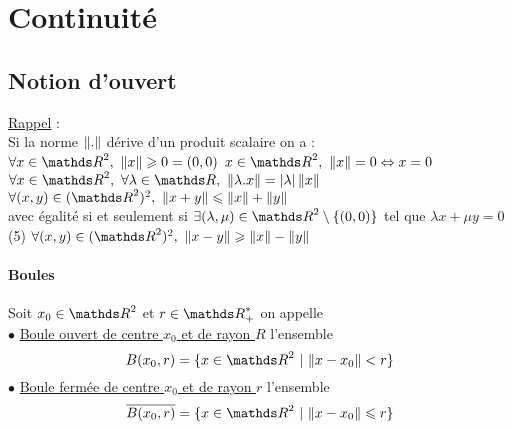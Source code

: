 

\minitoc
	\section{Continuité}
	\subsection{Notion d'ouvert}
		\uline{Rappel} : \\
		Si la norme ${\| . \|}$ dérive d'un produit scalaire on a :\\
		\un $\forall x\in \R^2 ,~\norm{x}\geqslant 0=(0,0)$ \hfill \deux $x\in \R^2 ,~\norm{x} = 0 \Leftrightarrow x=0$ \hfill ${}$ \\
		\trois $\forall x\in \R^2 ,~\forall \lambda\in\R,~ \norm{\lambda.x}=\mc{\lambda}\norm{x}$\\
		\quatre $\forall (x,y) \in (\R^2)^2,~ \norm{x+y}\leqslant\norm{x}+\norm{y}$ \\ \hspace*{0.5cm} avec égalité si et seulement si $\exists (\lambda,\mu)\in \R^2\setminus\{(0,0)\}$ tel que $\lambda x +\mu y = 0$\\
		{\scriptsize (5)} $\forall (x,y)\in (\R^2)^2 ,~\norm{x-y} \geqslant \norm{x} - \norm{y}$
		\vspace*{0.5cm} \\  \newpage \traitd
		\paragraph{Boules}
			Soit $x_0\in\R^2$ et $r\in\R_+^*$ on appelle \\
			\hspace*{2cm} $\bullet$ \uline{Boule ouvert de centre $x_0$ et de rayon $R$} l'ensemble \[ B(x_0,r) = \{ x\in\R^2 ~|~\norm{x-x_0} < r\} \]
			\hspace*{2cm} $\bullet$ \uline{Boule fermée de centre $x_0$ et de rayon $r$} l'ensemble \[ \overline{B(x_0,r)} = \{ x\in\R^2 ~|~\norm{x-x_0} \leqslant r\}\]
			\trait ${}$ \vspace*{-1.2cm} \traitd
